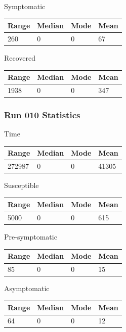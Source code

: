 \documentclass{article}
\begin{document}
Symptomatic
\newline
\begin{tabular}{| l | l | l | l |}
  \hline\hline
  Range & Median & Mode & Mean \\
  \hline
  260 & 0 & 0 & 67 \\
  \hline
\end{tabular} 

Recovered
\newline
\begin{tabular}{| l | l | l | l |}
  \hline\hline
  Range & Median & Mode & Mean \\
  \hline
  1938 & 0 & 0 & 347 \\
  \hline
\end{tabular} 

\subsubsection{Run 010 Statistics}
Time
\newline
\begin{tabular}{| l | l | l | l |}
  \hline\hline
  Range & Median & Mode & Mean \\
  \hline
  272987 & 0 & 0 & 41305 \\
  \hline
\end{tabular} 

Susceptible
\newline
\begin{tabular}{| l | l | l | l |}
  \hline\hline
  Range & Median & Mode & Mean \\
  \hline
  5000 & 0 & 0 & 615 \\
  \hline
\end{tabular} 

Pre-symptomatic
\newline
\begin{tabular}{| l | l | l | l |}
  \hline\hline
  Range & Median & Mode & Mean \\
  \hline
  85 & 0 & 0 & 15 \\
  \hline
\end{tabular} 

Asymptomatic
\newline
\begin{tabular}{| l | l | l | l |}
  \hline\hline
  Range & Median & Mode & Mean \\
  \hline
  64 & 0 & 0 & 12 \\
  \hline
\end{tabular} 
\end{document}
